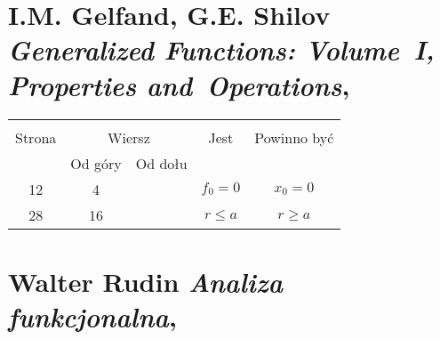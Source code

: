 \documentclass[a4paper,11pt]{article}
\begin{document}
\VerSpaceSix












\section{I.M. Gelfand, G.E. Shilov \\
  \textit{Generalized Functions: Volume~I, Properties
    and~Operations},
  \cite{GelfandShilovGeneralizedFunctionsVolI1964}}




\begin{center}

  \begin{tabular}{|c|c|c|c|c|}
    \hline
    & \multicolumn{2}{c|}{} & & \\
    Strona & \multicolumn{2}{c|}{Wiersz} & Jest
                              & Powinno być \\ \cline{2-3}
    & Od góry & Od dołu & & \\
    \hline
    12  &  4 & & $f_{ 0 } = 0$ & $x_{ 0 } = 0$ \\
    28  & 16 & & $r \leq a$ & $r \geq a$ \\
    \hline
  \end{tabular}

\end{center}

\VerSpaceSix













\section{Walter Rudin \textit{Analiza funkcjonalna},
  \cite{RudinAnalizaFunkcjonalna2012}}



\end{document}
